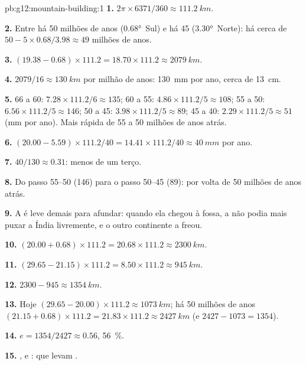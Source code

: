 \begin{solution}{pb:g12:mountain-building:1}
\textbf{1.} $2\pi \times 6371/360 \approx \qty{111.2}{km}$.

\textbf{2.} Entre há 50 milhões de anos (\ang{0.68}~Sul) e há 45
(\ang{3.30}~Norte): há cerca de $50 - 5 \times 0.68/3.98 \approx 49$ milhões
de anos.

\textbf{3.} $(19.38 - 0.68) \times 111.2 = 18.70 \times 111.2 \approx
\qty{2079}{km}$.

\textbf{4.} $2079/16 \approx \qty{130}{km}$ por milhão de anos: \qty{130}{mm}
por ano, cerca de \qty{13}{cm}.

\textbf{5.} 66 a 60: $7.28 \times 111.2/6 \approx 135$; 60 a 55: $4.86
\times 111.2/5 \approx 108$; 55 a 50: $6.56 \times 111.2/5 \approx 146$; 50
a 45: $3.98 \times 111.2/5 \approx 89$; 45 a 40: $2.29 \times 111.2/5
\approx 51$ (\unit{mm} por ano). Mais rápida de 55 a 50 milhões de anos atrás.

\textbf{6.} $(20.00 - 5.59) \times 111.2/40 = 14.41 \times 111.2/40 \approx
\qty{40}{mm}$ por ano.

\textbf{7.} $40/130 \approx 0.31$: menos de um terço.

\textbf{8.} Do passo 55--50 (146) para o passo 50--45 (89): por volta de 50
milhões de anos atrás.

\textbf{9.} A  é leve demais para afundar: quando ela
chegou à fossa, a  não podia mais puxar a Índia livremente, e o
outro continente a freou.

\textbf{10.} $(20.00 + 0.68) \times 111.2 = 20.68 \times 111.2 \approx
\qty{2300}{km}$.

\textbf{11.} $(29.65 - 21.15) \times 111.2 = 8.50 \times 111.2 \approx
\qty{945}{km}$.

\textbf{12.} $2300 - 945 \approx \qty{1354}{km}$.

\textbf{13.} Hoje $(29.65 - 20.00) \times 111.2 \approx \qty{1073}{km}$;
há 50 milhões de anos $(21.15 + 0.68) \times 111.2 = 21.83 \times 111.2
\approx \qty{2427}{km}$ (e $2427 - 1073 = 1354$).

\textbf{14.} $e = 1354/2427 \approx 0.56$, \qty{56}{\percent}.

\textbf{15.} , e :  que levam .


\end{solution}
